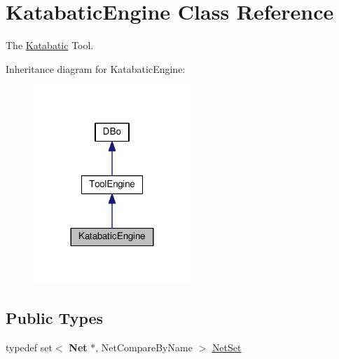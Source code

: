 \hypertarget{classKatabatic_1_1KatabaticEngine}{}\section{Katabatic\+Engine Class Reference}
\label{classKatabatic_1_1KatabaticEngine}


The \hyperlink{namespaceKatabatic}{Katabatic} Tool.  




Inheritance diagram for Katabatic\+Engine\+:\nopagebreak
\begin{figure}[H]
\begin{center}
\leavevmode
\includegraphics[width=168pt]{classKatabatic_1_1KatabaticEngine__inherit__graph}
\end{center}
\end{figure}
\subsection*{Public Types}
\begin{DoxyCompactItemize}
\item 
typedef set$<$ \textbf{ Net} $\ast$, Net\+Compare\+By\+Name $>$ \hyperlink{classKatabatic_1_1KatabaticEngine_a92ed88f9aecd2f195089c4029fa8bcc7}{Net\+Set}
\end{DoxyCompactItemize}
